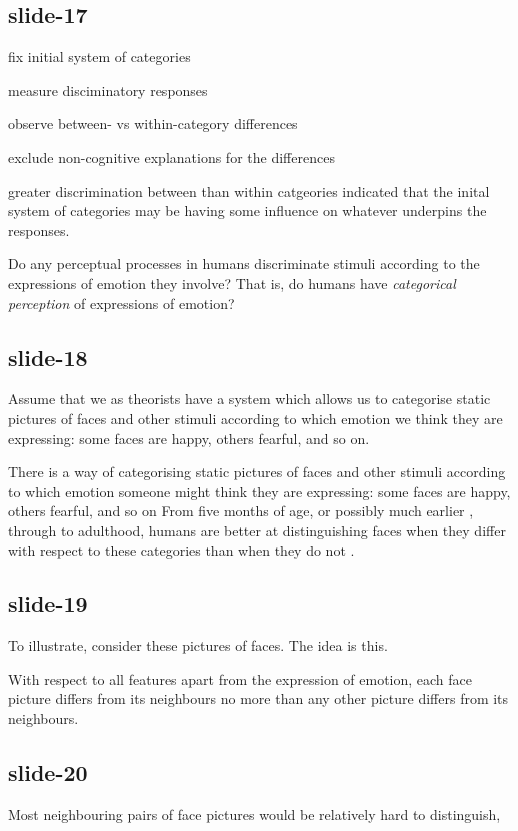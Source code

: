 \documentclass[12pt,\papersize]{extarticle}
\begin{document}
\subsection{slide-17}
fix initial system of categories

measure disciminatory responses

observe between- vs within-category differences

exclude non-cognitive explanations for the differences


greater discrimination between than within catgeories indicated that the inital
system of categories may be having some influence on whatever underpins
the responses.

Do any perceptual processes in humans discriminate stimuli according to the expressions
of emotion they involve?
That is, do humans have \emph{categorical perception} of expressions of emotion?

\subsection{slide-18}
Assume that we as theorists have a system which allows us to categorise
static pictures of faces and other stimuli according to which emotion we
think they are expressing: some faces are happy, others fearful, and so on.

There is a way of categorising static pictures of faces and other stimuli according to which emotion
someone might think they are expressing: some faces are happy, others fearful, and so on
From five months of age,
or possibly much earlier \citep{field:1982_discrimination},
through to adulthood, humans are better at distinguishing faces when they
differ with respect to these categories than when they do not
\citep{Etcoff:1992zd,Gelder:1997bf,Bornstein:2003vq,Kotsoni:2001ph,cheal:2011_categorical,hoonhorst:2011_categoricala}.

\subsection{slide-19}
To illustrate, consider these pictures of faces.
The idea is this.

With respect to all features apart from the expression of emotion, each face picture differs from its neighbours no more than any other picture differs from its neighbours.

\subsection{slide-20}
Most neighbouring pairs of face pictures would be relatively hard to distinguish,
\end{document}
